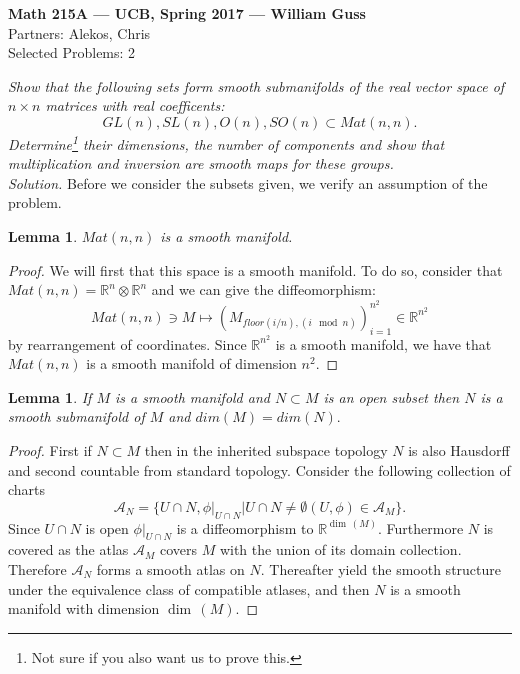 \documentclass[11pt]{amsart}
\newtheorem{lemma}[theorem]{Lemma}
\theoremstyle{definition}
\numberwithin{theorem}{section}
\numberwithin{definition}{section}
\numberwithin{equation}{section}
\def\dim{\operatorname{dim}\,}
\def\scripta{{\mathcal A}}
\begin{document}
\begin{center}{\bf Math 215A --- UCB, Spring 2017 --- William Guss} \\
Partners: Alekos, Chris \\
Selected Problems: 2
\end{center}


\medskip {} \emph{Show that the following sets form smooth submanifolds of the real vector space of $n \times n$ matrices with real coefficents:}
\begin{equation*}
	GL(n), SL(n), O(n), SO(n) \subset Mat(n,n).
\end{equation*}
\emph{Determine\footnote{Not sure if you also want us to prove this.} their dimensions, the number of components and show that multiplication and inversion are smooth maps for these groups.}\\

\noindent \emph{Solution.} Before we consider the subsets given, we verify an assumption of the problem.

\begin{lemma}
$Mat(n,n)$ is a smooth manifold.
\end{lemma}
\begin{proof}
We will first that this space is a smooth manifold. To do so, consider that $Mat(n,n) = \mathbb{R}^n \otimes \mathbb{R}^n$ and we can give the diffeomorphism:
	\begin{equation*}
		Mat(n,n) \ni M \mapsto (M_{floor(i/n),(i \mod n)})_{i=1}^{n^2} \in \mathbb{R}^{n^2}
	\end{equation*}
	by rearrangement of coordinates. Since $\mathbb{R}^{n^2}$ is a smooth manifold, we have that $Mat(n,n)$ is a smooth manifold of dimension $n^2.$ 
\end{proof}

\begin{lemma}
	If $M$ is a smooth manifold and $N \subset M$ is an open subset then $N$ is a smooth submanifold of $M$ and $dim(M) = dim(N).$
\end{lemma}
\begin{proof}
 First if $N \subset M$ then in the inherited subspace topology $N$ is also Hausdorff and second countable from standard topology. Consider the following collection of charts
 \begin{equation*}
  	\scripta_N = \{U\cap N, \phi|_{U\cap N}\mathrel{}\Big|\mathrel{} U \cap N \neq \emptyset (U, \phi) \in \scripta_M \}.
  \end{equation*} 
  Since $U \cap N$ is open $\phi|_{U\cap N}$ is a diffeomorphism to $\mathbb{R}^{\dim(M)}$. Furthermore $N$ is covered as the atlas $\scripta_M$ covers $M$ with the union of its domain collection. Therefore $\scripta_N$ forms a smooth atlas on $N$.  Thereafter yield the smooth structure under the equivalence class of compatible atlases, and then $N$ is a smooth manifold with dimension $\dim(M).$
\end{proof}
 
\end{document}
